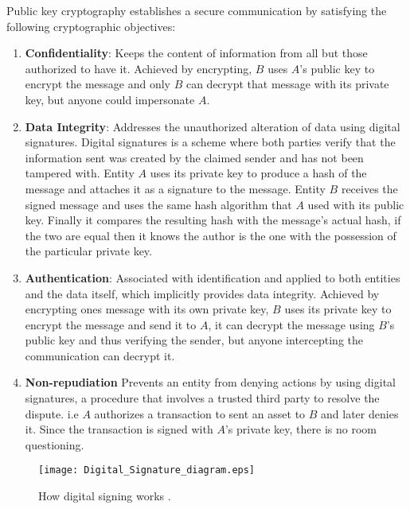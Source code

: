 Public key cryptography establishes a secure communication by satisfying the following cryptographic objectives:
\begin{enumerate}
    \item \textbf{Confidentiality}: Keeps the content of information from all but those authorized to have it. Achieved by encrypting, $B$ uses $A$'s public key to encrypt the message and only $B$ can decrypt that message with its private key, but anyone could impersonate $A$.
    \item \textbf{Data Integrity}: Addresses the unauthorized alteration of data using digital signatures. Digital signatures is a scheme where both parties verify that the information sent was created by the claimed sender and has not been tampered with. Entity $A$ uses its private key to produce a hash of the message and attaches it as a signature to the message. Entity $B$ receives the signed message and uses the same hash algorithm that $A$ used with its public key. Finally it compares the resulting hash with the message's actual hash, if the two are equal then it knows the author is the one with the possession of the particular private key.
    \item \textbf{Authentication}: Associated with identification and applied to both entities and the data itself, which implicitly provides data integrity. Achieved by encrypting ones message with its own private key, $B$ uses its private key to encrypt the message and send it to $A$, it can decrypt the message using $B$'s public key and thus verifying the sender, but anyone intercepting the communication can decrypt it.
    \item \textbf{Non-repudiation} Prevents an entity from denying actions by using digital signatures, a procedure that involves a trusted third party to resolve the dispute. i.e  $A$ authorizes a transaction to sent an asset to $B$ and later denies it. Since the transaction is signed with $A$'s private key, there is no room questioning.
\end{enumerate}
\begin{figure}[H]
        \centering
        \texttt{[image: Digital\_Signature\_diagram.eps]}
        \caption{How digital signing works \cite{wiki:digital-signature}.}
        \label{fig:dig_sign}
    \end{figure}	
